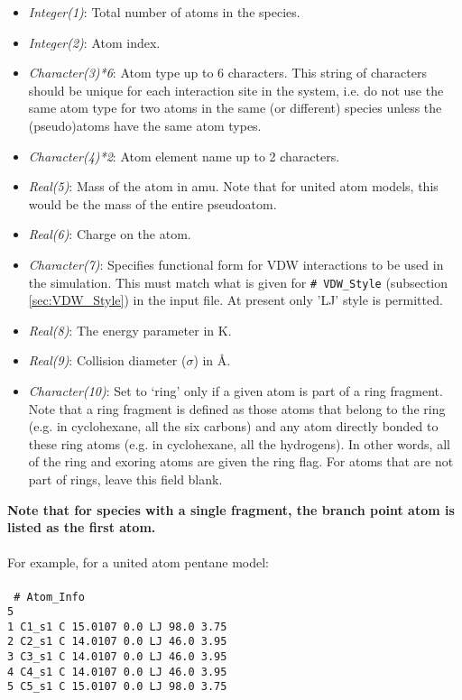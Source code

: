 \begin{itemize} 
%
\item {\it Integer(1)}: Total number of atoms in the species. 
%
\item {\it Integer(2)}: Atom index. 
%
\item {\it Character(3)*6}: Atom type up to 6 characters. This string of characters should be
unique for each interaction site in the system, i.e. do not use the same atom type
for two atoms in the same (or different) species unless the (pseudo)atoms have the same atom types. 
%
\item {\it Character(4)*2}: Atom element name up to 2 characters. 
%
\item {\it Real(5)}: Mass of the atom in amu. Note that for united atom models, this would be the
mass of the entire pseudoatom. 
%
\item {\it Real(6)}: Charge on the atom.
%
\item {\it Character(7)}: Specifies functional form for VDW interactions to be used in the simulation. This
must match what is given for \texttt{\# VDW\_Style}  (subsection \ref{sec:VDW_Style}) in the input file.  
At present only 'LJ' style is permitted.
%
\item {\it Real(8)}: The energy parameter in K.
%
\item {\it Real(9)}: Collision diameter ($\sigma$)  in \AA.
%
\item {\it Character(10)}: Set to `ring' only if a given atom is part of a
ring fragment. Note that a ring fragment is defined as those atoms that belong to the ring
(e.g. in cyclohexane, all the six carbons) and any atom directly bonded to these ring atoms
(e.g. in cyclohexane, all the hydrogens).  In other words, all of the ring and exoring atoms are given the ring
flag. For atoms that are not part of rings, leave this field blank. 
\end{itemize} 
%
{\bf Note that for species with a single fragment, the branch point atom
 is listed as the first atom.} \\ \\
%
For example, for a united atom pentane model: \\ \\
%
\texttt{
\# Atom\_Info\\
5\\
1    C1\_s1    C    15.0107    0.0    LJ    98.0    3.75\\
2    C2\_s1    C    14.0107    0.0    LJ    46.0    3.95\\
3    C3\_s1    C    14.0107    0.0    LJ    46.0    3.95\\
4    C4\_s1    C    14.0107    0.0    LJ    46.0    3.95\\
5    C5\_s1    C    15.0107    0.0    LJ    98.0    3.75\\
} \\ 
